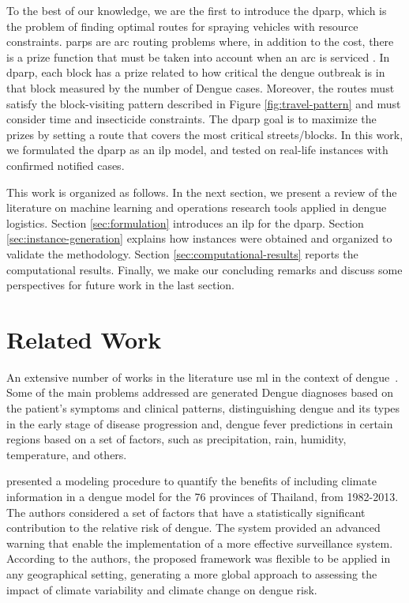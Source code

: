 \documentclass[a4paper,11pt]{article}
\begin{document}
To the  best of our  knowledge, we are the  first to introduce  the \gls{dparp},
which  is the  problem  of finding  optimal routes  for  spraying vehicles  with
resource constraints. \gls{parp}s are arc routing problems where, in addition to
the cost, there is a prize function that  must be taken into account when an arc
is serviced \citep{araoz:2006}.  In \gls{dparp}, each block has  a prize related
to how critical the  dengue outbreak is in that block measured  by the number of
Dengue  cases. Moreover,  the  routes must  satisfy  the block-visiting  pattern
described  in  Figure  \ref{fig:travel-pattern}   and  must  consider  time  and
insecticide  constraints. The  \gls{dparp} goal  is  to maximize  the prizes  by
setting a route  that covers the most critical streets/blocks.  In this work, we
formulated  the \gls{dparp}  as  an  \gls{ilp} model,  and  tested on  real-life
instances with confirmed notified cases.

This work is organized  as follows. In the next section, we  present a review of
the  literature on  machine learning  and operations  research tools  applied in
dengue logistics. Section \ref{sec:formulation}  introduces an \gls{ilp} for the
\gls{dparp}. Section  \ref{sec:instance-generation} explains how  instances were
obtained    and    organized    to    validate    the    methodology.    Section
\ref{sec:computational-results} reports  the computational results.  Finally, we
make our concluding remarks and discuss some perspectives for future work in the
last section.
\newline

\section{Related Work} \label{sec:related-work}

An extensive number  of works in the  literature use \gls{ml} in  the context of
dengue~\citep{shakurat:2015,shakil:2015,hair:2019,sarma:2020,appice:2020}.  Some
of  the main  problems addressed  are generated  Dengue diagnoses  based on  the
patient's symptoms and clinical patterns, distinguishing dengue and its types in
the early stage of disease progression  and, dengue fever predictions in certain
regions  based on  a  set of  factors, such  as  precipitation, rain,  humidity,
temperature, and others.

\cite{lowe:2015}  presented a  modeling procedure  to quantify  the benefits  of
including  climate  information in  a  dengue  model  for  the 76  provinces  of
Thailand, from  1982-2013. The authors considered  a set of factors  that have a
statistically  significant contribution  to  the relative  risk  of dengue.  The
system provided  an advanced warning  that enable  the implementation of  a more
effective surveillance system. According to  the authors, the proposed framework
was flexible to be applied in any geographical setting, generating a more global
approach to  assessing the impact of  climate variability and climate  change on
dengue risk.
\end{document}
